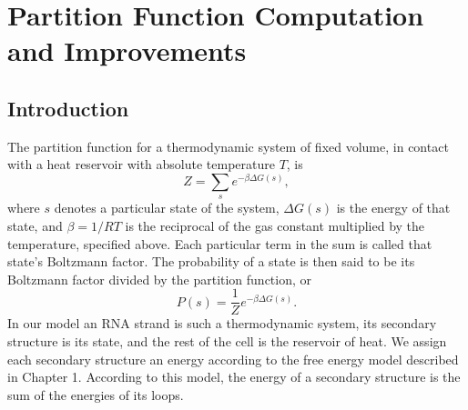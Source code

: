 \chapter{Partition Function Computation and Improvements} \label{pfChapter}
\section{Introduction}

The partition function for a thermodynamic system of fixed volume, in
contact with a heat reservoir with absolute temperature $T$, is
\begin{equation} Z = \sum_s e^{- \beta \Delta G(s) }, \end{equation}
where $s$ denotes a particular state of the system, $\Delta G(s)$ is
the energy of that state, and $\beta = 1/RT$ is the reciprocal of the
gas constant multiplied by the temperature, specified above. Each
particular term in the sum is called that state's Boltzmann
factor. The probability of a state is then said to be its Boltzmann
factor divided by the partition function, or
\begin{equation} P(s) = \frac{1}{Z}e^{-\beta \Delta G(s)}.  \end{equation}
In our model an RNA strand is such a thermodynamic system, its
secondary structure is its state, and the rest of the cell is the
reservoir of heat. We assign each secondary structure an energy
according to the free energy model described in Chapter 1. According
to this model, the energy of a secondary structure is the sum of the
energies of its loops. 

